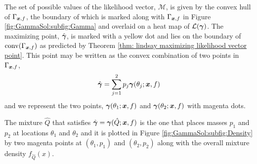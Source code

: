 		
		The set of possible values of the likelihood vector, $\mathcal{M}$, is given by the convex hull of $\Gamma_{{\bm{{x}}}, f}$, the boundary of which is marked along with $\Gamma_{{\bm{{x}}}, f}$ in Figure \ref{fig:GammaSol:subfig:Gamma} and overlaid on a heat map of $\mathcal{L}({\bm{{\gamma}}})$. The maximizing point, $\hat{{\bm{{\gamma}}}}$, is marked with a yellow dot and lies on the boundary of $\mathrm{conv}(\Gamma_{{\bm{{x}}}, f})$ as predicted by Theorem \ref{thm: lindsay maximizing likelihood vector point}. This point may be written as the convex combination of two points in $\Gamma_{{\bm{{x}}}, f}$,
		\begin{equation}
			\hat{{\bm{{\gamma}}}} = \sum_{j = 1}^2 p_j {\bm{{\gamma}}}(\theta_j;{\bm{{x}}}, f)
		\end{equation}
		and we represent the two points, ${\bm{{\gamma}}}(\theta_1;{\bm{{x}}}, f)$ and ${\bm{{\gamma}}}(\theta_2;{\bm{{x}}}, f)$ with magenta dots.

		The mixture $\hat{Q}$ that satisfies $\hat{{\bm{{\gamma}}}} = {\bm{{\gamma}}}(\hat{Q};{\bm{{x}}}, f)$ is the one that places masses $p_1$ and $p_2$ at locations $\theta_1$ and $\theta_2$ and it is plotted in Figure \ref{fig:GammaSol:subfig:Density} by two magenta points at $(\theta_1, p_1)$ and $(\theta_2, p_2)$ along with the overall mixture density $f_{\hat{Q}}(x)$.



